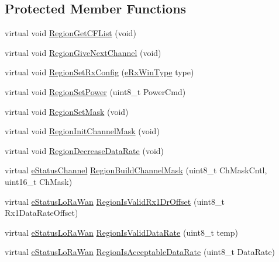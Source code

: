 \subsection*{Protected Member Functions}
\begin{DoxyCompactItemize}
\item 
virtual void \mbox{\hyperlink{class_lora_regions_e_u_acdbe1d2f767912fac7edf295961dfb6b}{Region\+Get\+C\+F\+List}} (void)
\item 
virtual void \mbox{\hyperlink{class_lora_regions_e_u_adf5f39b2b13ad1dca0eccb80123c261d}{Region\+Give\+Next\+Channel}} (void)
\item 
virtual void \mbox{\hyperlink{class_lora_regions_e_u_a1222a9362e7ba3715d9848af850af3f0}{Region\+Set\+Rx\+Config}} (\mbox{\hyperlink{_define_8h_ab894a4c21b8aae9e9c68d8c426a66956}{e\+Rx\+Win\+Type}} type)
\item 
virtual void \mbox{\hyperlink{class_lora_regions_e_u_a322d0f9d2a00243ef01fe15c017ed288}{Region\+Set\+Power}} (uint8\+\_\+t Power\+Cmd)
\item 
virtual void \mbox{\hyperlink{class_lora_regions_e_u_a9aef35dea0d5101768696bed87fa8380}{Region\+Set\+Mask}} (void)
\item 
virtual void \mbox{\hyperlink{class_lora_regions_e_u_a3662471b098dc1e319ab386eaf0b3f52}{Region\+Init\+Channel\+Mask}} (void)
\item 
virtual void \mbox{\hyperlink{class_lora_regions_e_u_ad6bf116000ec083c6e7e0a7f930aa2c6}{Region\+Decrease\+Data\+Rate}} (void)
\item 
virtual \mbox{\hyperlink{_define_8h_abbfbf157098d2505c0cf33877b128cc9}{e\+Status\+Channel}} \mbox{\hyperlink{class_lora_regions_e_u_af19055a7f2df125b3937ebaf033f50af}{Region\+Build\+Channel\+Mask}} (uint8\+\_\+t Ch\+Mask\+Cntl, uint16\+\_\+t Ch\+Mask)
\item 
virtual \mbox{\hyperlink{_define_8h_a1cea710adbbf5b02bced8f79cd82f7b9}{e\+Status\+Lo\+Ra\+Wan}} \mbox{\hyperlink{class_lora_regions_e_u_a6dc681bc39f00825ed46e9636d9acf52}{Region\+Is\+Valid\+Rx1\+Dr\+Offset}} (uint8\+\_\+t Rx1\+Data\+Rate\+Offset)
\item 
virtual \mbox{\hyperlink{_define_8h_a1cea710adbbf5b02bced8f79cd82f7b9}{e\+Status\+Lo\+Ra\+Wan}} \mbox{\hyperlink{class_lora_regions_e_u_aeb59fccca463d845279c448a6fa46548}{Region\+Is\+Valid\+Data\+Rate}} (uint8\+\_\+t temp)
\item 
virtual \mbox{\hyperlink{_define_8h_a1cea710adbbf5b02bced8f79cd82f7b9}{e\+Status\+Lo\+Ra\+Wan}} \mbox{\hyperlink{class_lora_regions_e_u_a367dcb126971269dce46511383696bad}{Region\+Is\+Acceptable\+Data\+Rate}} (uint8\+\_\+t Data\+Rate)

\end{DoxyCompactItemize}
